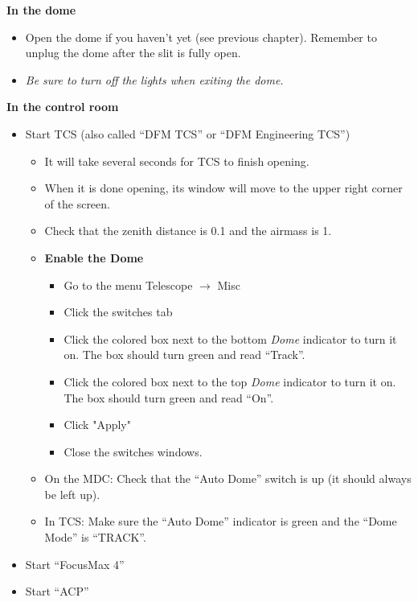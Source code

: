 \documentclass[letterpaper, 12pt]{report}
\begin{document}
\noindent
{\large\textbf{In the dome}}
\begin{itemize}
	\item Open the dome if you haven't yet (see previous chapter). Remember to unplug the dome after the slit is fully open.
	\item \emph{Be sure to turn off the lights when exiting the dome.}
\end{itemize}

\noindent
{\large\textbf{In the control room}}
\begin{itemize}
	\item Start TCS (also called ``DFM TCS'' or ``DFM Engineering TCS'')
	\begin{itemize}
		\item It will take several seconds for TCS to finish opening.
		\item When it is done opening, its window will move to the upper right corner of the screen.
		\item Check that the zenith distance is 0.1 and the airmass is 1.
		\item \textbf{Enable the Dome}
		\begin{itemize}
			\item Go to the menu Telescope $\rightarrow$ Misc
			\item Click the switches tab
			\item Click the colored box next to the bottom \emph{Dome} indicator to turn it on. The box should turn green and read ``Track''.
			\item Click the colored box next to the top \emph{Dome} indicator to turn it on. The box should turn green and read ``On''.
			\item Click "Apply"
			\item Close the switches windows.
		\end{itemize}
		\item On the MDC: Check that the ``Auto Dome'' switch is up (it should always be left up).
		\item In TCS: Make sure the ``Auto Dome'' indicator is green and the ``Dome Mode'' is ``TRACK''.
	\end{itemize}
	\item Start ``FocusMax 4''
	\item Start ``ACP''

\end{itemize}
\end{document}
